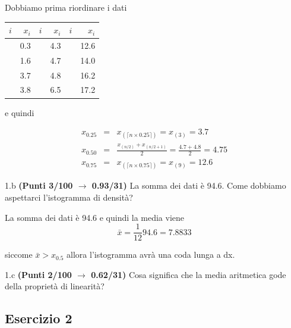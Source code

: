 \documentclass[
  11pt,
]{book}
\theoremstyle{mytheoremstyle}
\theoremstyle{mydefstyle}
\newenvironment{sol}
  {
  \begin{tcolorbox}[enhanced,breakable,arc=0.1mm,boxrule=1pt,colback=white,colframe=iblue,
  title=\bf \fontfamily{lmss}\selectfont \hspace{.5 cm} Soluzione,drop fuzzy shadow]

}{
\end{tcolorbox}
  }
\begin{document}
\begin{sol}

Dobbiamo prima riordinare i dati

\begin{table}[H]
\centering
\begin{tabular}{>{\raggedright\arraybackslash}p{3em}r>{\raggedright\arraybackslash}p{3em}r>{\raggedright\arraybackslash}p{3em}r}
\toprule
$i$ & $x_{i}$ & $i$ & $x_{i}$ & $i$ & $x_{i}$\\
\midrule
\cellcolor[HTML]{E6E6E6}{$(1)$} & 0.3 & \cellcolor[HTML]{E6E6E6}{$(5)$} & 4.3 & \cellcolor[HTML]{E6E6E6}{$(9)$} & 12.6\\
\cellcolor[HTML]{E6E6E6}{$(2)$} & 1.6 & \cellcolor[HTML]{E6E6E6}{$(6)$} & 4.7 & \cellcolor[HTML]{E6E6E6}{$(10)$} & 14.0\\
\cellcolor[HTML]{E6E6E6}{$(3)$} & 3.7 & \cellcolor[HTML]{E6E6E6}{$(7)$} & 4.8 & \cellcolor[HTML]{E6E6E6}{$(11)$} & 16.2\\
\cellcolor[HTML]{E6E6E6}{$(4)$} & 3.8 & \cellcolor[HTML]{E6E6E6}{$(8)$} & 6.5 & \cellcolor[HTML]{E6E6E6}{$(12)$} & 17.2\\
\bottomrule
\end{tabular}
\end{table}

e quindi

\begin{eqnarray*}
x_{0.25} &=& x_{(\lceil n\times0.25\rceil)}=x_{(3)}=3.7\\
x_{0.50} &=& \frac{x_{(n/2)}+x_{(n/2+1)}}{2}=\frac{4.7+4.8}{2}
=4.75\\
x_{0.75} &=& x_{(\lceil n\times0.75\rceil)}=x_{(9)}=12.6
\end{eqnarray*}

\end{sol}

1.b \textbf{(Punti 3/100 \(\rightarrow\) 0.93/31)} La somma dei dati è 94.6. Come dobbiamo aspettarci l'istogramma di densità?

\begin{sol}
La somma dei dati è 94.6 e quindi la media viene
\[
\bar x=\frac 1{12}94.6=7.8833
\]

siccome \(\bar x>x_{0.5}\) allora l'istogramma avrà una coda lunga a dx.

\end{sol}

1.c \textbf{(Punti 2/100 \(\rightarrow\) 0.62/31)} Cosa significa che la media aritmetica gode della proprietà di linearità?

\subsection{Esercizio 2}\label{esercizio-2-6}
\end{document}
